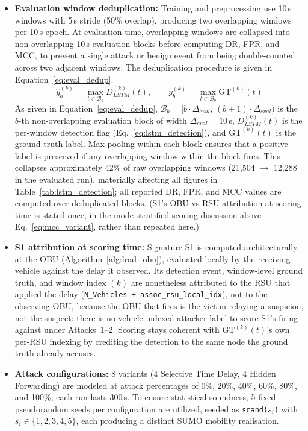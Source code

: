 \documentclass[12pt, a4paper]{report}
\begin{document}
{{\begin{itemize}
    \item \textbf{Evaluation window deduplication:}
Training and preprocessing use 10\,s windows with
5\,s stride (50\% overlap), producing two overlapping
windows per 10\,s epoch. At evaluation time, overlapping
windows are collapsed into non-overlapping 10\,s
evaluation blocks before computing \ac{DR}, \ac{FPR},
and \ac{MCC}, to prevent a single attack or benign
event from being double-counted across two adjacent
windows. The deduplication procedure is given in
Equation~\eqref{eq:eval_dedup}.
\begin{equation}
\hat{y}_b^{(k)} =
\max_{t \in \mathcal{B}_b} D_{LSTM}^{(k)}(t),
\qquad
y_b^{(k)} =
\max_{t \in \mathcal{B}_b} \text{GT}^{(k)}(t)
\label{eq:eval_dedup}
\end{equation}
As given in Equation~\eqref{eq:eval_dedup},
$\mathcal{B}_b = [b\cdot\Delta_{eval},\,
(b{+}1)\cdot\Delta_{eval})$ is the $b$-th
non-overlapping evaluation block of width
$\Delta_{eval} = 10$\,s, $D_{LSTM}^{(k)}(t)$
is the per-window detection flag
(Eq.~\ref{eq:lstm_detection}), and
$\text{GT}^{(k)}(t)$ is the ground-truth label.
Max-pooling within each block ensures that a
positive label is preserved if any overlapping
window within the block fires. This collapses
approximately 42\% of raw overlapping windows
(21{,}504 $\to$ 12{,}288 in the evaluated run),
materially affecting all figures in
Table~\ref{tab:lstm_detection}; all reported
\ac{DR}, \ac{FPR}, and \ac{MCC} values are
computed over deduplicated blocks.
(S1's OBU-vs-RSU attribution at scoring time is stated once, in the
mode-stratified scoring discussion above Eq.~\ref{eq:mcc_variant}, rather
than repeated here.)

    \item \textbf{S1 attribution at scoring time:} Signature S1 is computed
architecturally at the \ac{OBU} (Algorithm~\ref{alg:lrad_obu}), evaluated
locally by the receiving vehicle against the delay it observed. Its
detection event, window-level ground truth, and window index $(k)$ are
nonetheless attributed to the \ac{RSU} that applied the delay
(\texttt{N\_Vehicles + assoc\_rsu\_local\_idx}), not to the observing
\ac{OBU}, because the OBU that fires is the victim relaying a suspicion,
not the suspect: there is no vehicle-indexed attacker label to score S1's
firing against under Attacks~1--2. Scoring stays coherent with
$\text{GT}^{(k)}(t)$'s own per-RSU indexing by crediting the detection to
the same node the ground truth already accuses.

    \item \textbf{Attack configurations:} 8 variants (4 Selective Time Delay, 4 Hidden Forwarding) are modeled at attack percentages of 0\%, 20\%, 40\%, 60\%, 80\%, and 100\%; each run lasts 300\,s. To ensure statistical soundness, 5 fixed pseudorandom seeds per configuration are utilized, seeded as \texttt{srand($s_i$)} with $s_i \in \{1,2,3,4,5\}$, each producing a distinct SUMO mobility realisation.


\end{itemize}}}
\end{document}
